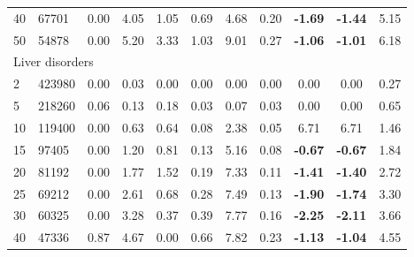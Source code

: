 {\begin{longtable}{@{}llccccccccc@{}}
\multicolumn{1}{l|}{40} & \multicolumn{1}{l|}{67701}      & 0.00 & \multicolumn{1}{c|}{4.05}  & 1.05  & \multicolumn{1}{c|}{0.69} & 4.68  & \multicolumn{1}{c|}{0.20} & \textbf{-1.69} & \textbf{-1.44} & 5.15  \\
\multicolumn{1}{l|}{50} & \multicolumn{1}{l|}{54878}      & 0.00 & \multicolumn{1}{c|}{5.20}  & 3.33  & \multicolumn{1}{c|}{1.03} & 9.01  & \multicolumn{1}{c|}{0.27} & \textbf{-1.06} & \textbf{-1.01} & 6.18  \\ \hline
\multicolumn{11}{l}{Liver disorders}                                                                                                                                                                            \\ \hline
\multicolumn{1}{l|}{2}  & \multicolumn{1}{l|}{423980}     & 0.00 & \multicolumn{1}{c|}{0.03}  & 0.00  & \multicolumn{1}{c|}{0.00} & 0.00  & \multicolumn{1}{c|}{0.00} & 0.00           & 0.00           & 0.27  \\
\multicolumn{1}{l|}{5}  & \multicolumn{1}{l|}{218260}     & 0.06 & \multicolumn{1}{c|}{0.13}  & 0.18  & \multicolumn{1}{c|}{0.03} & 0.07  & \multicolumn{1}{c|}{0.03} & 0.00           & 0.00           & 0.65  \\
\multicolumn{1}{l|}{10} & \multicolumn{1}{l|}{119400}     & 0.00 & \multicolumn{1}{c|}{0.63}  & 0.64  & \multicolumn{1}{c|}{0.08} & 2.38  & \multicolumn{1}{c|}{0.05} & 6.71           & 6.71           & 1.46  \\
\multicolumn{1}{l|}{15} & \multicolumn{1}{l|}{97405}      & 0.00 & \multicolumn{1}{c|}{1.20}  & 0.81  & \multicolumn{1}{c|}{0.13} & 5.16  & \multicolumn{1}{c|}{0.08} & \textbf{-0.67} & \textbf{-0.67} & 1.84  \\
\multicolumn{1}{l|}{20} & \multicolumn{1}{l|}{81192}      & 0.00 & \multicolumn{1}{c|}{1.77}  & 1.52  & \multicolumn{1}{c|}{0.19} & 7.33  & \multicolumn{1}{c|}{0.11} & \textbf{-1.41} & \textbf{-1.40} & 2.72  \\
\multicolumn{1}{l|}{25} & \multicolumn{1}{l|}{69212}      & 0.00 & \multicolumn{1}{c|}{2.61}  & 0.68  & \multicolumn{1}{c|}{0.28} & 7.49  & \multicolumn{1}{c|}{0.13} & \textbf{-1.90} & \textbf{-1.74} & 3.30  \\
\multicolumn{1}{l|}{30} & \multicolumn{1}{l|}{60325}      & 0.00 & \multicolumn{1}{c|}{3.28}  & 0.37  & \multicolumn{1}{c|}{0.39} & 7.77  & \multicolumn{1}{c|}{0.16} & \textbf{-2.25} & \textbf{-2.11} & 3.66  \\
\multicolumn{1}{l|}{40} & \multicolumn{1}{l|}{47336}      & 0.87 & \multicolumn{1}{c|}{4.67}  & 0.00  & \multicolumn{1}{c|}{0.66} & 7.82  & \multicolumn{1}{c|}{0.23} & \textbf{-1.13} & \textbf{-1.04} & 4.55  \\

\end{longtable}}
